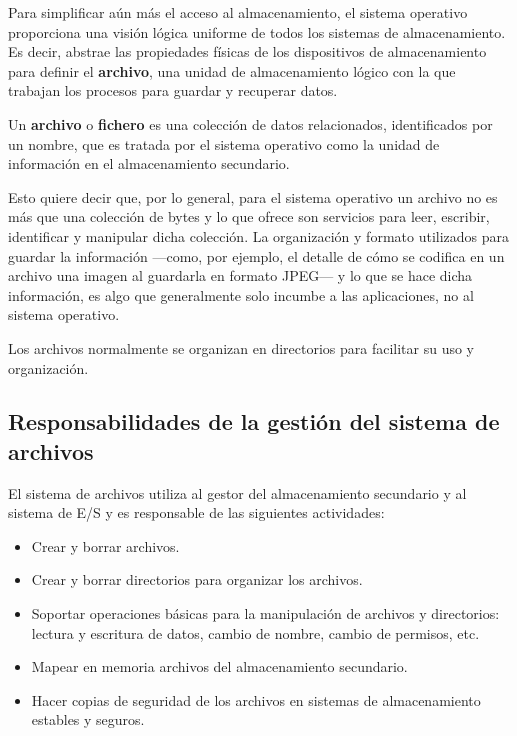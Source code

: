 Para simplificar aún más el acceso al almacenamiento, el sistema
operativo proporciona una visión lógica uniforme de todos los sistemas
de almacenamiento. Es decir, abstrae las propiedades físicas de los
dispositivos de almacenamiento para definir el \textbf{archivo}, una
unidad de almacenamiento lógico con la que trabajan los procesos para
guardar y recuperar datos.

Un \textbf{{}archivo} o \textbf{{}fichero} es una colección de datos
relacionados, identificados por un nombre, que es tratada por el sistema
operativo como la unidad de información en el almacenamiento secundario.

Esto quiere decir que, por lo general, para el sistema operativo un
archivo no es más que una colección de bytes y lo que ofrece son
servicios para leer, escribir, identificar y manipular dicha colección.
La organización y formato utilizados para guardar la información
---como, por ejemplo, el detalle de cómo se codifica en un archivo una
imagen al guardarla en formato JPEG--- y lo que se hace dicha
información, es algo que generalmente solo incumbe a las aplicaciones,
no al sistema operativo.

Los archivos normalmente se organizan en directorios para facilitar su
uso y organización.

\subsection{Responsabilidades de la gestión del sistema de
archivos}\label{_responsabilidades_de_la_gestiuxf3n_del_sistema_de_archivos}

El sistema de archivos utiliza al gestor del almacenamiento secundario y
al sistema de E/S y es responsable de las siguientes actividades:

\begin{itemize}
\item
  Crear y borrar archivos.
\item
  Crear y borrar directorios para organizar los archivos.
\item
  Soportar operaciones básicas para la manipulación de archivos y
  directorios: lectura y escritura de datos, cambio de nombre, cambio de
  permisos, etc.
\item
  Mapear en memoria archivos del almacenamiento secundario.
\item
  Hacer copias de seguridad de los archivos en sistemas de
  almacenamiento estables y seguros.
\end{itemize}

